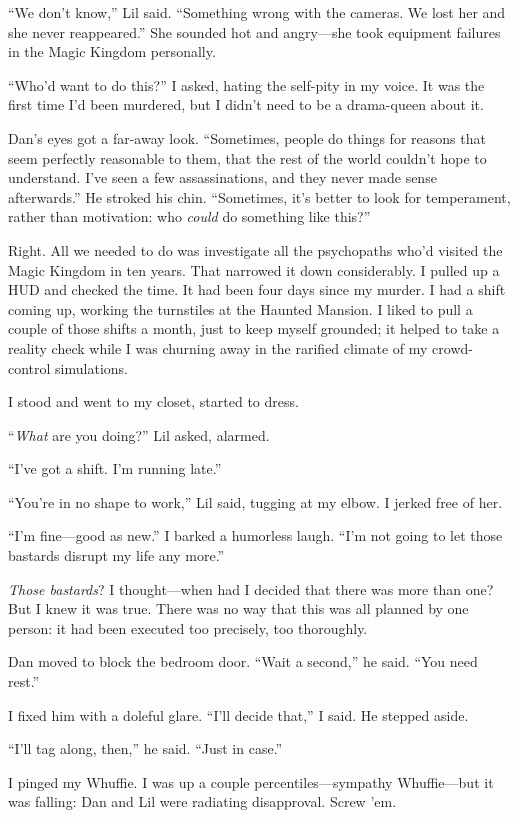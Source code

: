 “We don't know,” Lil said. “Something wrong with the cameras. We
lost her and she never reappeared.” She sounded hot and angry—she
took equipment failures in the Magic Kingdom personally.

“Who'd want to do this?” I asked, hating the self-pity in my voice.
It was the first time I'd been murdered, but I didn't need to be a
drama-queen about it.

Dan's eyes got a far-away look. “Sometimes, people do things for
reasons that seem perfectly reasonable to them, that the rest of
the world couldn't hope to understand. I've seen a few
assassinations, and they never made sense afterwards.” He stroked
his chin. “Sometimes, it's better to look for temperament, rather
than motivation: who \emph{could} do something like this?”

Right. All we needed to do was investigate all the psychopaths
who'd visited the Magic Kingdom in ten years. That narrowed it down
considerably. I pulled up a HUD and checked the time. It had been
four days since my murder. I had a shift coming up, working the
turnstiles at the Haunted Mansion. I liked to pull a couple of
those shifts a month, just to keep myself grounded; it helped to
take a reality check while I was churning away in the rarified
climate of my crowd-control simulations.

I stood and went to my closet, started to dress.

“\emph{What} are you doing?” Lil asked, alarmed.

“I've got a shift. I'm running late.”

“You're in no shape to work,” Lil said, tugging at my elbow. I
jerked free of her.

“I'm fine—good as new.” I barked a humorless laugh. “I'm not going
to let those bastards disrupt my life any more.”

\emph{Those bastards}? I thought—when had I decided that there was
more than one? But I knew it was true. There was no way that this
was all planned by one person: it had been executed too precisely,
too thoroughly.

Dan moved to block the bedroom door. “Wait a second,” he said. “You
need rest.”

I fixed him with a doleful glare. “I'll decide that,” I said. He
stepped aside.

“I'll tag along, then,” he said. “Just in case.”

I pinged my Whuffie. I was up a couple percentiles—sympathy
Whuffie—but it was falling: Dan and Lil were radiating disapproval.
Screw 'em.

